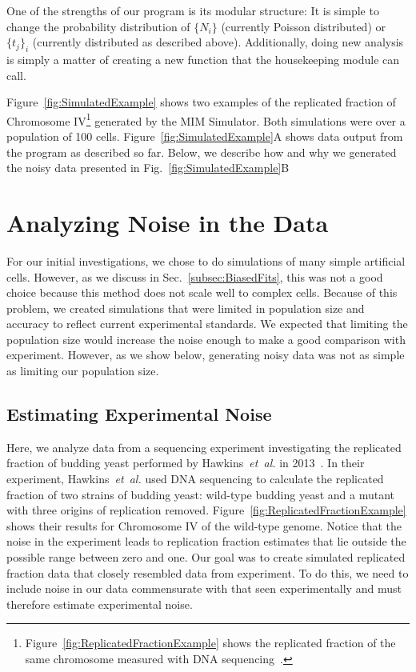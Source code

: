 		One of the strengths of our program is its modular structure: It is simple to change the probability distribution of $\{N_i\}$ (currently Poisson distributed) or $\{t_j\}_i$ (currently distributed as described above).
		Additionally, doing new analysis is simply a matter of creating a new function that the housekeeping module can call.
		
		Figure~\ref{fig:SimulatedExample} shows two examples of the replicated fraction of Chromosome IV\footnote{
		Figure~\ref{fig:ReplicatedFractionExample} shows the replicated fraction of the same chromosome measured with DNA sequencing~\cite{StochasticTermination}.}
		generated by the MIM Simulator.
		Both simulations were over a population of 100 cells.
		Figure~\ref{fig:SimulatedExample}A shows data output from the program as described so far.
		Below, we describe how and why we generated the noisy data presented in Fig.~\ref{fig:SimulatedExample}B
		
		
	\section{Analyzing Noise in the Data}
	\label{sec:Noise}
	
	For our initial investigations, we chose to do simulations of many simple artificial cells.
	However, as we discuss in Sec.~\ref{subsec:BiasedFits}, this was not a good choice because this method does not scale well to complex cells.
	Because of this problem, we created simulations that were limited in population size and accuracy to reflect current experimental standards.
	We expected that limiting the population size would increase the noise enough to make a good comparison with experiment.
	However, as we show below, generating noisy data was not as simple as limiting our population size.
	
	
		\subsection{Estimating Experimental Noise}
		\label{subsec:SequencingNoise}
		
		Here, we analyze data from a sequencing experiment investigating the replicated fraction of budding yeast performed by Hawkins~\emph{et~al.} in 2013~\cite{StochasticTermination}.
		In their experiment, Hawkins~\emph{et~al.} used DNA sequencing to calculate the replicated fraction of two strains of budding yeast: wild-type budding yeast and a mutant with three origins of replication removed.
		Figure~\ref{fig:ReplicatedFractionExample} shows their results for Chromosome IV of the wild-type genome.
		Notice that the noise in the experiment leads to replication fraction estimates that lie outside the possible range between zero and one.
		Our goal was to create simulated replicated fraction data that closely resembled data from experiment.
		To do this, we need to include noise in our data commensurate with that seen experimentally and must therefore estimate experimental noise.
		
